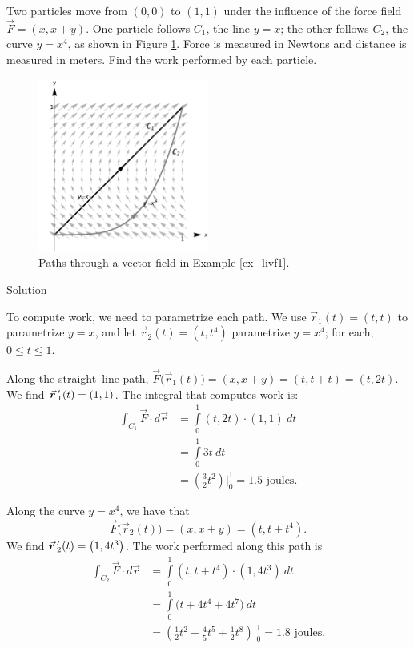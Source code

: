 \begin{example}\label{ex_livf1}
Two particles move from $(0,0)$ to $(1,1)$ under the influence of the force field $\vec F  = \left( x, x+y\right)$. One particle follows $C_1$, the line $y=x$; the other follows $C_2$, the curve $y=x^4$, as shown in Figure \ref{fig_double_28}. Force is measured in Newtons and distance is measured in meters. Find the work performed by each particle.


\begin{figure}[H]
	\begin{center}
			\includegraphics[width=0.5\textwidth]{fig_double_28}
	\caption{Paths through a vector field in Example \ref{ex_livf1}.}
	\label{fig_double_28}
	\end{center}
\end{figure}


Solution 

To compute work, we need to parametrize each path. We use $\vec r_1(t) = \left( t,t\right)$ to parametrize $y=x$, and let $\vec r_2(t) =\left( t,t^4\right)$ parametrize $y=x^4$; for each, $0\leq t\leq 1$. 

Along the straight--line path, $\vec F\big(\vec r_1(t)\big) = \left( x, x+y\right) = \left( t, t+t\right) = \left( t,2t\right)$. We find $\vrp_1(t) =\left( 1,1\right)$. The integral that computes work is:
\begin{align*}
\int_{C_1} \vec F\cdot d\vec r &= \int\limits_0^1 \left( t,2t\right)\cdot\left( 1,1\right)\ dt \\
			&= \int\limits_0^1 3t\ dt \\
			&= \left(\frac32t^2\right)\Bigg|_0^1 = 1.5 \text{ joules}.
\end{align*}

Along the curve $y = x^4$, we have that
$$\vec F\big(\vec r_2(t)\big) = \left( x, x+y\right) = \left( t, t+t^4\right).$$ We find $\vrp_2(t) = \left( 1, 4t^3\right)$. The work performed along this path is
\begin{align*}
\int_{C_2} \vec F\cdot d\vec r &= \int\limits_0^1 \left( t,t+t^4\right)\cdot\left( 1,4t^3\right)\ dt\\
			&= \int\limits_0^1 \big(t + 4t^4+ 4t^7\big)\ dt \\
			&= \left(\frac12t^2 + \frac45t^5 + \frac12t^8\right)\Bigg|_0^1 =  1.8 \text{ joules}.
\end{align*}



\end{example}
